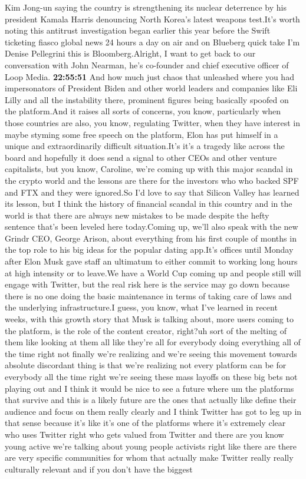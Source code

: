 \documentclass{article}%
\begin{document}
Kim Jong{-}un saying the country is strengthening its nuclear deterrence by his president Kamala Harris denouncing North Korea's latest weapons test.It's worth noting this antitrust investigation began earlier this year before the Swift ticketing fiasco global news 24 hours a day on air and on Blueberg quick take I'm Denise Pellegrini this is Bloomberg.Alright, I want to get back to our conversation with John Nearman, he's co{-}founder and chief executive officer of Loop Media.%
\textbf{22:55:51}%
\newline%
And how much just chaos that unleashed where you had impersonators of President Biden and other world leaders and companies like Eli Lilly and all the instability there, prominent figures being basically spoofed on the platform.And it raises all sorts of concerns, you know, particularly when those countries are also, you know, regulating Twitter, when they have interest in maybe styming some free speech on the platform, Elon has put himself in a unique and extraordinarily difficult situation.It's it's a tragedy like across the board and hopefully it does send a signal to other CEOs and other venture capitalists, but you know, Caroline, we're coming up with this major scandal in the crypto world and the lessons are there for the investors who who backed SPF and FTX and they were ignored.So I'd love to say that Silicon Valley has learned its lesson, but I think the history of financial scandal in this country and in the world is that there are always new mistakes to be made despite the hefty sentence that's been leveled here today.Coming up, we'll also speak with the new Grindr CEO, George Arison, about everything from his first couple of months in the top role to his big ideas for the popular dating app.It's offices until Monday after Elon Musk gave staff an ultimatum to either commit to working long hours at high intensity or to leave.We have a World Cup coming up and people still will engage with Twitter, but the real risk here is the service may go down because there is no one doing the basic maintenance in terms of taking care of laws and the underlying infrastructure.I guess, you know, what I've learned in recent weeks, with this growth story that Musk is talking about, more users coming to the platform, is the role of the content creator, right?uh sort of the melting of them like looking at them all like they're all for everybody doing everything all of the time right not finally we're realizing and we're seeing this movement towards absolute discordant thing is that we're realizing not every platform can be for everybody all the time right we're seeing these mass layoffs on these big bets not playing out and I think it would be nice to see a future where um the platforms that survive and this is a likely future are the ones that actually like define their audience and focus on them really clearly and I think Twitter has got to leg up in that sense because it's like it's one of the platforms where it's extremely clear who uses Twitter right who gets valued from Twitter and there are you know young active we're talking about young people activists right like there are there are very specific communities for whom that actually make Twitter really really culturally relevant and if you don't have the biggest 
\end{document}
